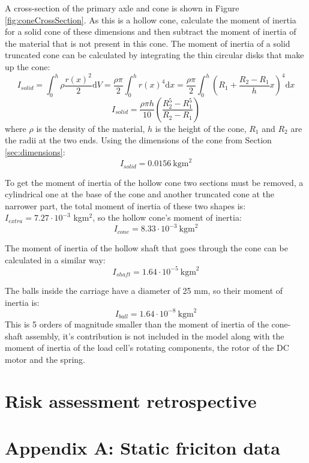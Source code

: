 \documentclass[12pt]{article}
\begin{document}
A cross-section of the primary axle and cone is shown in Figure \ref{fig:coneCrossSection}. As this is a hollow cone, calculate the moment of inertia for a solid cone of these dimensions and then subtract the moment of inertia of the material that is not present in this cone.
The moment of inertia of a solid truncated cone can be calculated by integrating the thin circular disks that make up the cone:
$$I_{solid} = \int_0^h \rho \frac{r(x)^2}{2} \text{d}V = \frac{\rho \pi }{2} \int_0^h r(x)^4 \text{d}x =\frac{\rho \pi }{2} \int_0^h \left( R_1 + \frac{R_2-R_1}{h}x \right)^4 \text{d}x $$
$$I_{solid} = \frac{\rho \pi h }{10}\left( \frac{R_2^5-R_1^5}{R_2-R_1}\right)$$
where $\rho$ is the density of the material, $h$ is the height of the cone, $R_1$ and $R_2$ are the radii at the two ends. Using the dimensions of the cone from Section \ref{sec:dimensions}:
$$I_{solid} = 0.0156~\text{kgm}^2$$

To get the moment of inertia of the hollow cone two sections must be removed, a cylindrical one at the base of the cone and another truncated cone at the narrower part, the total moment of inertia of these two shapes is: $I_{extra} = 7.27\cdot 10^{-3}$ kgm$^2$, so the hollow cone's moment of inertia:
$$I_{cone} = 8.33\cdot 10^{-3}~\text{kgm}^2$$

The moment of inertia of the hollow shaft that goes through the cone can be calculated in a similar way: 
$$I_{shaft} = 1.64\cdot 10^{-5}~\text{kgm}^2$$ 

The balls inside the carriage have a diameter of 25 mm, so their moment of inertia is:
$$I_{ball} = 1.64\cdot 10^{-8}~\text{kgm}^2$$
This is 5 orders of magnitude smaller than the moment of inertia of the cone-shaft assembly, it's contribution is not included in the model along with the moment of inertia of the load cell's rotating components, the rotor of the DC motor and the spring.







\section{Risk assessment retrospective}

\printbibliography

\clearpage

\section*{Appendix A: Static friciton data}
\end{document}

